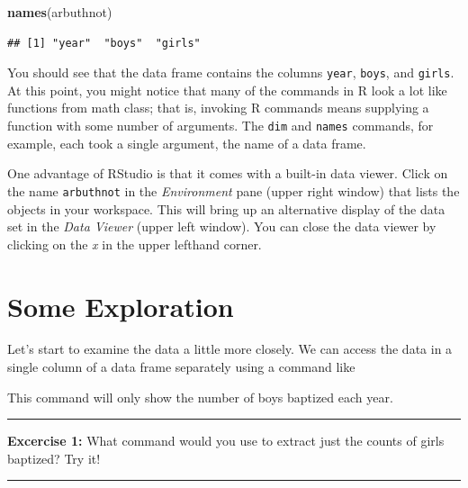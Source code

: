 \documentclass[]{book}
\newenvironment{Shaded}{\begin{snugshade}}{\end{snugshade}}
\newcommand{\KeywordTok}[1]{\textcolor[rgb]{0.13,0.29,0.53}{\textbf{#1}}}
\newcommand{\OperatorTok}[1]{\textcolor[rgb]{0.81,0.36,0.00}{\textbf{#1}}}
\newcommand{\NormalTok}[1]{#1}
\theoremstyle{definition}
\theoremstyle{definition}
\theoremstyle{definition}
\theoremstyle{remark}
\begin{document}
\begin{Shaded}
\begin{Highlighting}[]
\KeywordTok{names}\NormalTok{(arbuthnot)}
\end{Highlighting}
\end{Shaded}

\begin{verbatim}
## [1] "year"  "boys"  "girls"
\end{verbatim}

You should see that the data frame contains the columns \texttt{year},
\texttt{boys}, and \texttt{girls}. At this point, you might notice that
many of the commands in R look a lot like functions from math class;
that is, invoking R commands means supplying a function with some number
of arguments. The \texttt{dim} and \texttt{names} commands, for example,
each took a single argument, the name of a data frame.

One advantage of RStudio is that it comes with a built-in data viewer.
Click on the name \texttt{arbuthnot} in the \emph{Environment} pane
(upper right window) that lists the objects in your workspace. This will
bring up an alternative display of the data set in the \emph{Data
Viewer} (upper left window). You can close the data viewer by clicking
on the \emph{x} in the upper lefthand corner.

\section{Some Exploration}\label{some-exploration}

Let's start to examine the data a little more closely. We can access the
data in a single column of a data frame separately using a command like

\begin{Shaded}
\end{Shaded}

This command will only show the number of boys baptized each year.

\begin{center}\rule{0.5\linewidth}{\linethickness}\end{center}

\textbf{Excercise 1:} What command would you use to extract just the
counts of girls baptized? Try it!

\begin{center}\rule{0.5\linewidth}{\linethickness}\end{center}
\end{document}
